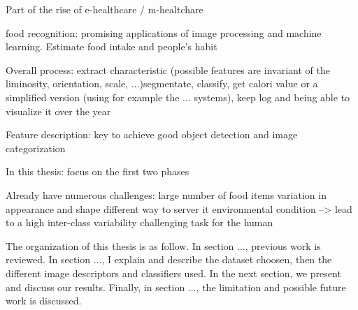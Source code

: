 Part of the rise of e-healthcare / m-healtchare \cite{Hillestad2005, Menachemi2011}

food recognition: promising applications of image processing and machine learning. Estimate food intake and people's habit

Overall process:
extract characteristic (possible features are invariant of the liminosity, orientation, scale, ...)segmentate, classify, get calori value or a simplified version (using for example the ... systems), keep log and being able to visualize it over the year

Feature description: key to achieve good object detection and image categorization

In this thesis: focus on the first two phases

Already have numerous challenges:
large number of food items
variation in appearance and shape
different way to server it
environmental condition
--> lead to a high inter-class variability
challenging task for the human

The organization of this thesis is as follow. In section ..., previous work is reviewed. In section ..., I explain and describe the dataset choosen, then the different image descriptors and classifiers used. In the next section, we present and discuss our results. Finally, in section ..., the limitation and possible future work is discussed.


